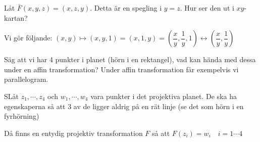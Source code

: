 \noindent Låt $\bar{F}(x,y,z)=(x,z,y)$. Detta är en spegling i $y=z$. Hur ser den ut i $xy$-kartan?\par
\noindent Vi gör följande: $(x,y)\mapsto(x,y,1)=(x,1,y) = \left(\dfrac{x}{y},\dfrac{1}{y},1\right)\leftrightarrow\left(\dfrac{x}{y},\dfrac{1}{y}\right)$
\par\bigskip
\noindent Säg att vi har 4 punkter i planet (hörn i en rektangel), vad kan hända med dessa under en affin transformation? Under affin transformation får exempelvis vi parallelogram.
\par\bigskip
\begin{theo}
  SLåt $z_1,\cdots, z_4$ och $w_1,\cdots, w_4$ vara punkter i det projektiva planet. De ska ha egenskaperna så att 3 av de ligger aldrig på en rät linje (se det som hörn i en fyrhörning)
  \par\bigskip
  \noindent Då finns en entydig projektiv transformation $F$ så att $F(z_i) = w_i\quad i=1\cdots4$
\end{theo}
\par\bigskip
